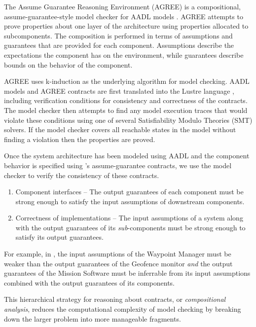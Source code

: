 
The Assume Guarantee Reasoning Environment (AGREE) is a compositional, assume-guarantee-style model
checker for AADL models \cite{compositional-analysis-agree}. AGREE attempts to prove properties about one layer
of the architecture using properties allocated to subcomponents. The composition is performed in
terms of assumptions and guarantees that are provided for each component. Assumptions describe the
expectations the component has on the environment, while guarantees describe bounds on the behavior
of the component. 

AGREE uses k-induction as the underlying algorithm for model checking.  AADL models and AGREE
contracts are first translated into the Lustre language \cite{lustre}, including verification conditions for consistency
and correctness of the contracts.  The model checker then attempts to find any model execution traces
that would violate these conditions using one of several Satisfiability Modulo Theories (SMT) solvers. 
If the model checker covers all reachable states in the model without finding a violation then the properties are proved. 

Once the system architecture has been modeled using AADL
and the component behavior is specified using \agree's assume-guarantee contracts,
we use the \agree{} model checker to verify the consistency of these contracts.

\begin{enumerate}
\item Component interfaces -- The output guarantees of each component must be strong enough to
satisfy the input assumptions of downstream components. 
\item Correctness of implementations -- The input assumptions of a system along with the 
output guarantees of its \emph{sub}-components must be strong enough to satisfy its output guarantees.
\end{enumerate}

For example, in ,
the input assumptions of the Waypoint Manager must be weaker than
the output guarantees of the Geofence monitor 
\textit{and} the output guarantees of the Mission Software must be inferrable from
its input assumptions combined with the output guarantees of its components.

This hierarchical strategy for reasoning about contracts,
or \emph{compositional analysis},
reduces the computational complexity of model checking
by breaking down the larger problem into more manageable fragments.
